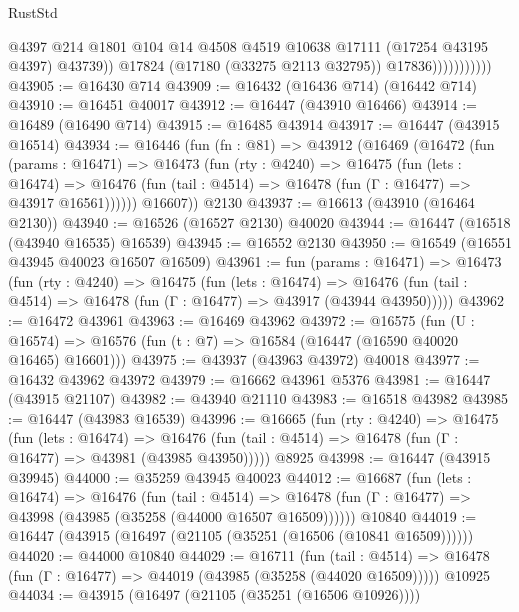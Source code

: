 \begin{lexlean}{RustStd}
\begin{coremodule}
{\begin{coremodule}
{{{{{{{{{{{{{{{{{{{{{{{{{{{{{{{{{{{{{{{{{{{{{{{{{{{{{{{                              @4397
                              @214
                              @1801
                              @104
                              @14
                              @4508
                              @4519
                              @10638
                              @17111
                              (@17254 @43195 @4397)
                              @43739))
                          @17824
                          (@17180 (@33275 @2113 @32795))
                          @17836)))))))))))
@43905 := @16430 @714
@43909 := @16432 (@16436 @714) (@16442 @714)
@43910 := @16451 @40017
@43912 := @16447 (@43910 @16466)
@43914 := @16489 (@16490 @714)
@43915 := @16485 @43914
@43917 := @16447 (@43915 @16514)
@43934 := @16446
    (fun (fn : @81) =>
    @43912
      (@16469
        (@16472
          (fun (params : @16471) =>
          @16473
            (fun (rty : @4240) =>
            @16475
              (fun (lets : @16474) =>
              @16476 (fun (tail : @4514) => @16478 (fun (Γ : @16477) => @43917 @16561))))))
        @16607))
    @2130
@43937 := @16613 (@43910 (@16464 @2130))
@43940 := @16526 (@16527 @2130) @40020
@43944 := @16447 (@16518 (@43940 @16535) @16539)
@43945 := @16552 @2130
@43950 := @16549 (@16551 @43945 @40023 @16507 @16509)
@43961 := fun (params : @16471) =>
  @16473
    (fun (rty : @4240) =>
    @16475
      (fun (lets : @16474) =>
      @16476 (fun (tail : @4514) => @16478 (fun (Γ : @16477) => @43917 (@43944 @43950)))))
@43962 := @16472 @43961
@43963 := @16469 @43962
@43972 := @16575
    (fun (U : @16574) => @16576 (fun (t : @7) => @16584 (@16447 (@16590 @40020 @16465) @16601)))
@43975 := @43937 (@43963 @43972) @40018
@43977 := @16432 @43962 @43972
@43979 := @16662 @43961 @5376
@43981 := @16447 (@43915 @21107)
@43982 := @43940 @21110
@43983 := @16518 @43982
@43985 := @16447 (@43983 @16539)
@43996 := @16665
    (fun (rty : @4240) =>
    @16475
      (fun (lets : @16474) =>
      @16476 (fun (tail : @4514) => @16478 (fun (Γ : @16477) => @43981 (@43985 @43950)))))
    @8925
@43998 := @16447 (@43915 @39945)
@44000 := @35259 @43945 @40023
@44012 := @16687
    (fun (lets : @16474) =>
    @16476
      (fun (tail : @4514) =>
      @16478 (fun (Γ : @16477) => @43998 (@43985 (@35258 (@44000 @16507 @16509))))))
    @10840
@44019 := @16447 (@43915 (@16497 (@21105 (@35251 (@16506 (@10841 @16509))))))
@44020 := @44000 @10840
@44029 := @16711
    (fun (tail : @4514) => @16478 (fun (Γ : @16477) => @44019 (@43985 (@35258 (@44020 @16509)))))
    @10925
@44034 := @43915 (@16497 (@21105 (@35251 (@16506 @10926))))
}}}}}}}}}}}}}}}}}}}}}}}}}}}}}}}}}}}}}}}}}}}}}}}}}}}}}}}
\end{coremodule}}
\end{coremodule}
\end{lexlean}
